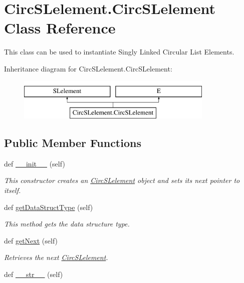 \hypertarget{class_circ_s_lelement_1_1_circ_s_lelement}{}\section{Circ\+S\+Lelement.\+Circ\+S\+Lelement Class Reference}
\label{class_circ_s_lelement_1_1_circ_s_lelement}


This class can be used to instantiate Singly Linked Circular List Elements.  


Inheritance diagram for Circ\+S\+Lelement.\+Circ\+S\+Lelement\+:\begin{figure}[H]
\begin{center}
\leavevmode
\includegraphics[height=2.000000cm]{class_circ_s_lelement_1_1_circ_s_lelement}
\end{center}
\end{figure}
\subsection*{Public Member Functions}
\begin{DoxyCompactItemize}
\item 
def \hyperlink{class_circ_s_lelement_1_1_circ_s_lelement_a414aec286eae256d9ae223384c18a89a}{\+\_\+\+\_\+init\+\_\+\+\_\+} (self)
\begin{DoxyCompactList}\small\item\em This constructor creates an \hyperlink{class_circ_s_lelement_1_1_circ_s_lelement}{Circ\+S\+Lelement} object and sets its next pointer to itself. \end{DoxyCompactList}\item 
def \hyperlink{class_circ_s_lelement_1_1_circ_s_lelement_aaf95c45ae15b141a085bfb49b072540b}{get\+Data\+Struct\+Type} (self)
\begin{DoxyCompactList}\small\item\em This method gets the data structure type. \end{DoxyCompactList}\item 
def \hyperlink{class_circ_s_lelement_1_1_circ_s_lelement_a708c22a49e359026a8d01d5fa7e98dbf}{get\+Next} (self)
\begin{DoxyCompactList}\small\item\em Retrieves the next \hyperlink{class_circ_s_lelement_1_1_circ_s_lelement}{Circ\+S\+Lelement}. \end{DoxyCompactList}\item 
def \hyperlink{class_circ_s_lelement_1_1_circ_s_lelement_ae75eb1b91bebd77b39fdb2c3345ded4b}{\+\_\+\+\_\+str\+\_\+\+\_\+} (self)
\end{DoxyCompactItemize}


